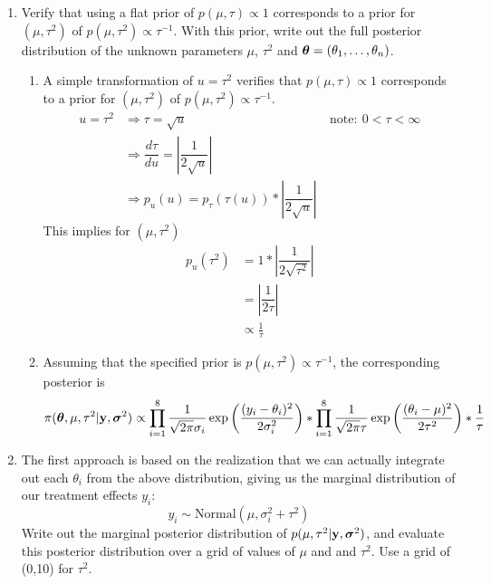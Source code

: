 \documentclass[12pt]{article}
\def\y{\mathbf{y}}
\newcommand{\si}{\mbox{\boldmath $\sigma$}}
\newcommand{\bth}{\mbox{\boldmath $\theta$}}
\begin{document}
\begin{enumerate}
	{\leftmargin=1em}
	
	\item Verify that using a flat prior of $p(\mu,\tau)\propto 1$ corresponds to a prior for $(\mu,\tau^2)$ of $p(\mu,\tau^2) \propto \tau^{-1}$. With this prior, write out the full posterior distribution of the unknown parameters $\mu$, $\tau^2$ and $\bth=(\theta_1,\ldots,\theta_n)$. 
	\begin{enumerate}
		\item A simple transformation of $u=\tau^2$ verifies that $p(\mu,\tau)\propto 1$ corresponds to a prior for $(\mu,\tau^2)$ of $p(\mu,\tau^2) \propto \tau^{-1}$. 
		\begin{align*}
			u = \tau^2 &\Rightarrow \tau=\sqrt{u} & \mathrm{note: } \ 0<\tau<\infty \\
			&\Rightarrow \dfrac{d\tau}{d u} = |\dfrac{1}{2 \sqrt{u}}| \\
			&\Rightarrow p_u (u) = p_\tau (\tau(u)) * |\dfrac{1}{2 \sqrt{u}}| \ 
		\end{align*}
		This implies for $(\mu,\tau^2)$ 
		\begin{align*}
			p_u (\tau^2) & = 1 * |\dfrac{1}{2 \sqrt{\tau^2}}| \\
			& = |\dfrac{1}{2 \tau } | \\
			& \propto \frac{1}{\tau} 
		\end{align*}
		
		\item Assuming that the specified prior is $p(\mu,\tau^2) \propto \tau^{-1}$, the corresponding posterior is
		\[
			\pi(\bth, \mu, \tau^2 | \mathbf{y}, \si^2) \propto \prod_{i=1}^8  \frac{1}{\sqrt{2\pi} \sigma_{i}} \exp \left( \frac{(y_i - \theta_i)^2}{2\sigma_{i}^2} \right) 
			* \prod_{i=1}^8 \frac{1}{\sqrt{2\pi} \tau} \exp\left(\frac{(\theta_i - \mu)^2}{2\tau^2} \right) * \frac{1}{\tau} 
		\]
	\end{enumerate}


	\item The first approach is based on the realization that we can actually integrate out each $\theta_i$ from the above distribution, giving us the marginal distribution of our treatment effects $y_i$: $$ y_i \sim \mbox{Normal}(\mu,\sigma^2_i+\tau^2) $$ Write out the marginal posterior distribution of $p(\mu,\tau^2|\y,\si^2)$, and evaluate this posterior distribution over a grid of values of $\mu$ and and $\tau^2$. Use a grid of (0,10) for $\tau^2$.
	

\end{enumerate}
\end{document}
